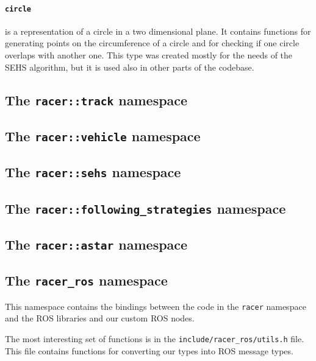 \paragraph{\texttt{circle}} is a representation of a circle in a two dimensional plane. It contains functions for generating points on the circumference of a circle and for checking if one circle overlaps with another one. This type was created mostly for the needs of the \gls{SEHS} algorithm, but it is used also in other parts of the codebase.

\subsection{The \texttt{racer::track} namespace}

\subsection{The \texttt{racer::vehicle} namespace}

\subsection{The \texttt{racer::sehs} namespace}

\subsection{The \texttt{racer::following\_strategies} namespace}

\subsection{The \texttt{racer::astar} namespace}

\subsection{The \texttt{racer\_ros} namespace}

This namespace contains the bindings between the code in the \texttt{racer} namespace and the \gls{ROS} libraries and our custom \gls*{ROS} nodes.

The most interesting set of functions is in the \texttt{include/racer\_ros/utils.h} file. This file contains functions for converting our types into \gls*{ROS} message types.